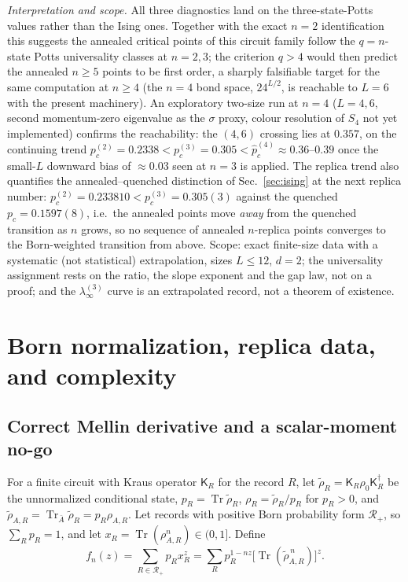 \documentclass[aps,prx,reprint,superscriptaddress,nobibnotes,longbibliography]{revtex4-2}
\theoremstyle{remark}
\newcommand{\Tr}{\operatorname{Tr}}
\begin{document}
\emph{Interpretation and scope.}  All three diagnostics land on the three-state-Potts values rather than the Ising ones.  Together with the exact $n=2$ identification this suggests the annealed critical points of this circuit family follow the $q=n$-state Potts universality classes at $n=2,3$; the criterion $q>4$ would then predict the annealed $n\ge5$ points to be first order, a sharply falsifiable target for the same computation at $n\ge4$ (the $n=4$ bond space, $24^{L/2}$, is reachable to $L=6$ with the present machinery).  An exploratory two-size run at $n=4$ ($L=4,6$, second momentum-zero eigenvalue as the $\sigma$ proxy, colour resolution of $S_4$ not yet implemented) confirms the reachability: the $(4,6)$ crossing lies at $0.357$, on the continuing trend $p_c^{(2)}=0.2338<p_c^{(3)}=0.305<\hat p_c^{(4)}\approx0.36$--$0.39$ once the small-$L$ downward bias of $\approx0.03$ seen at $n=3$ is applied.  The replica trend also quantifies the annealed--quenched distinction of Sec.~\ref{sec:ising} at the next replica number: $p_c^{(2)}=0.233810<p_c^{(3)}=0.305(3)$ against the quenched $p_c=0.1597(8)$, i.e.\ the annealed points move \emph{away} from the quenched transition as $n$ grows, so no sequence of annealed $n$-replica points converges to the Born-weighted transition from above.  Scope: exact finite-size data with a systematic (not statistical) extrapolation, sizes $L\le12$, $d=2$; the universality assignment rests on the ratio, the slope exponent and the gap law, not on a proof; and the $\lambda_\infty^{(3)}$ curve is an extrapolated record, not a theorem of existence.

\section{Born normalization, replica data, and complexity}

\subsection{Correct Mellin derivative and a scalar-moment no-go}

For a finite circuit with Kraus operator $\mathsf K_R$ for the record $R$, let $\tilde\rho_R=\mathsf K_R\rho_0\mathsf K_R^\dagger$ be the unnormalized conditional state, $p_R=\Tr\tilde\rho_R$, $\rho_R=\tilde\rho_R/p_R$ for $p_R>0$, and $\tilde\rho_{A,R}=\Tr_{\bar A}\tilde\rho_R=p_R\rho_{A,R}$.  Let records with positive Born probability form $\mathcal R_+$, so $\sum_Rp_R=1$, and let
$x_R=\Tr(\rho_{A,R}^n)\in(0,1]$.  Define
\begin{equation}
 f_n(z)=\sum_{R\in\mathcal R_+}p_Rx_R^z
 =\sum_Rp_R^{1-nz}\bigl[\Tr(\tilde\rho_{A,R}^{\,n})\bigr]^z.
 \label{eq:Mellin}
\end{equation}
\end{document}
